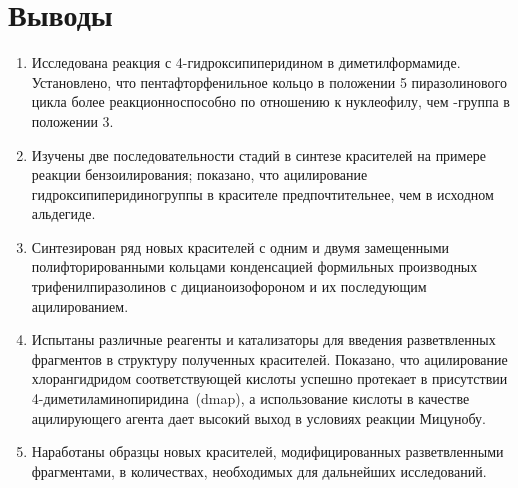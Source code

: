 \section{Выводы}
\begin{enumerate}
    \item Исследована реакция  с \mbox{4-гидроксипиперидином} в диметилформамиде. Установлено, что пентафторфенильное кольцо в положении 5 пиразолинового цикла более реакционноспособно по отношению к нуклеофилу, чем -группа в положении 3.
    \item Изучены две последовательности стадий в синтезе красителей на примере реакции бензоилирования; показано, что  ацилирование гидроксипиперидиногруппы в красителе предпочтительнее, чем в исходном альдегиде.
    \item Синтезирован ряд новых красителей с одним и двумя замещенными полифторированными кольцами конденсацией формильных производных трифенилпиразолинов с дицианоизофороном и их последующим ацилированием.
    \item Испытаны различные реагенты и катализаторы для введения разветвленных фрагментов в структуру полученных красителей. Показано, что ацилирование хлорангидридом соответствующей кислоты успешно протекает в присутствии \mbox{4-диметиламинопиридина}~(\ac{dmap}), а использование кислоты в качестве ацилирующего агента дает высокий выход в условиях реакции Мицунобу.
    \item Наработаны образцы новых красителей, модифицированных разветвленными фрагментами, в количествах, необходимых для дальнейших исследований.
\end{enumerate}



